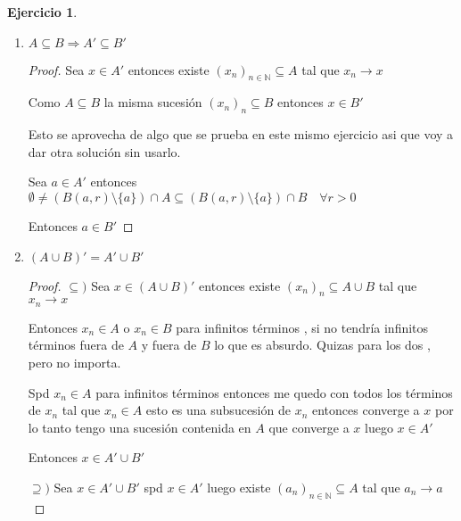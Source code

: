 \documentclass[12pt]{report}
\newcommand{\N}{\mathbb{N}}
\newcommand{\ra}{\rightarrow}
\theoremstyle{definition}
\newtheorem{ej}{Ejercicio}
\begin{document}
\begin{ej}
\begin{enumerate}
\begin{enumerate}
\begin{proof}
	    Entonces existe un $p_1 \in A'$ tal que $d(p_1,p) < \frac{r}{2}$ con $p_1 \neq p$ 

	    Además $p_1 \in A'$ luego $(B(p_1,\frac{r}{2})\setminus\{p_1\})\cap A \neq \emptyset$ 

	    Entonces $\exists a \in A$ tal que $d(a,p_1) < \frac{r}{2}$ 

	    Ahora $d(a,p) \leq d(a,p_1) + d(p_1,p) = \frac{r}{2} + \frac{r}{2} = r$ 

	    Entonces $a \in B(p,r)$ además $a \in A$ y $a\neq p$ por lo tanto $(B(p,r)\setminus\{p\})\cap A \neq \emptyset$

	    Y esto lo podemos hacer para cualquier $r$. 

	    Finalmente $p$ es punto de acumulación de $A$ o lo que es lo mismo $p \in A'$
	  \end{proof}
	\item $A \subseteq B \Longrightarrow A' \subseteq B'$
	  \begin{proof}
	    Sea $x \in A'$ entonces existe $(x_{n} )_{n \in \N} \subseteq A$ tal que $x_{n} \ra x$

	    Como $A \subseteq B$ la misma sucesión $(x_{n})_{n} \subseteq B$ entonces $x \in B'$

	    Esto se aprovecha de algo que se prueba en este mismo ejercicio asi que voy a dar otra solución sin usarlo.

	    Sea $a \in A'$ entonces $\emptyset \neq (B(a,r)\setminus \{a\}) \cap A  \subseteq (B(a,r)\setminus \{a\}) \cap B\quad \forall r>0 $

	    Entonces $a \in B' $
	  \end{proof}
	\item $(A \cup B)' = A' \cup B'$
	  \begin{proof}
	  $\subseteq )$ Sea $x \in (A \cup B)'$ entonces existe $(x_{n})_{n} \subseteq A \cup B$ tal que $x_{n} \ra x$

	    Entonces $x_{n} \in A$ o $x_{n} \in B$ para infinitos términos , si no tendría infinitos términos fuera de $A$ y fuera de $B$ lo que es absurdo. Quizas para los dos , pero no importa.

	    Spd $x_{n} \in A$ para infinitos términos entonces me quedo con todos los términos de $x_{n}$ tal que $x_{n} \in A$ esto es una subsucesión de $x_{n}$ entonces converge a $x$ por lo tanto tengo una sucesión contenida en $A$ que converge a $x$ luego $x \in A'$

	    Entonces $x \in A' \cup B'$

	  $\supseteq )$ Sea $x \in A' \cup B'$ spd $x \in A'$ luego existe $(a_{n})_{n \in \N} \subseteq A$ tal que $a_{n} \ra a$


\end{proof}
\end{enumerate}
\end{enumerate}
\end{ej}
\end{document}
